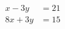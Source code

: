 \documentclass[border=5pt]{standalone}
\begin{document}
$\begin{aligned}
x-3y&=21\\8x+3y&=15
\end{aligned}$
\end{document}

